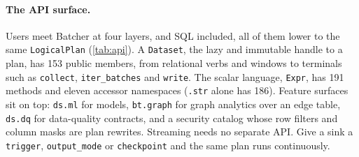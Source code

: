 \documentclass[10pt,twocolumn,letterpaper]{article}   %
\newcommand{\sys}{Batcher}
\begin{document}
\paragraph{The API surface.} Users meet \sys{} at four layers, and SQL included, all of them
lower to the same \texttt{LogicalPlan} (\cref{tab:api}). A \texttt{Dataset}, the lazy and
immutable handle to a plan, has 153 public members, from relational verbs and windows to
terminals such as \texttt{collect}, \texttt{iter\_batches} and \texttt{write}. The scalar
language, \texttt{Expr}, has 191 methods and eleven accessor namespaces (\texttt{.str} alone
has 186). Feature surfaces sit on top: \texttt{ds.ml} for models, \texttt{bt.graph} for graph
analytics over an edge table, \texttt{ds.dq} for data-quality contracts, and a security
catalog whose row filters and column masks are plan rewrites. Streaming needs no separate API.
Give a sink a \texttt{trigger}, \texttt{output\_mode} or \texttt{checkpoint} and the same plan
runs continuously.
\end{document}
